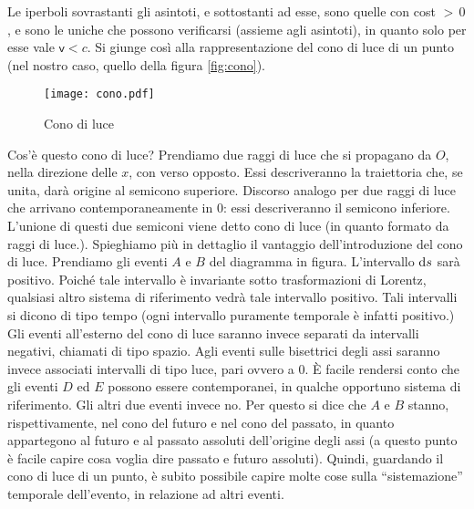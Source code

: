 Le iperboli sovrastanti gli asintoti, e sottostanti ad esse, sono
quelle con cost $>\,0$, e sono le uniche che possono verificarsi
(assieme agli asintoti), in quanto solo per esse vale
$\mathsf{v}<c$. Si giunge cos\`i alla rappresentazione del cono
di luce di un punto (nel nostro caso, quello della
figura \vref{fig:cono}).
\begin{figure}[tb]
  \begin{center}
     
       
    \texttt{[image: cono.pdf]}
    \caption{Cono di luce} \label{fig:cono}
  \end{center}
\end{figure}
Cos'\`e questo cono di luce? Prendiamo due raggi di luce che si
propagano da $O$, nella direzione delle $x$, con verso opposto.  Essi
descriveranno la traiettoria che, se unita, dar\`a origine al semicono
superiore. Discorso analogo per due raggi di luce che arrivano
contemporaneamente in $0$: essi descriveranno il semicono
inferiore. L'unione di questi due semiconi viene detto cono di luce
(in quanto formato da raggi di luce.). Spieghiamo pi\`u in dettaglio
il vantaggio dell'introduzione del cono di luce.  Prendiamo gli eventi
$A$ e $B$ del diagramma in figura.  L'intervallo $\mathrm{d} s$ sar\`a
positivo. Poich\'e tale intervallo \`e invariante sotto trasformazioni
di Lorentz, qualsiasi altro sistema di riferimento vedr\`a tale
 intervallo positivo. Tali intervalli si dicono di tipo tempo (ogni
intervallo puramente temporale \`e infatti positivo.) Gli eventi
all'esterno del cono di luce saranno invece separati da intervalli
negativi, chiamati di tipo spazio. Agli eventi sulle bisettrici degli
assi saranno invece associati intervalli di tipo luce, pari ovvero a
0. \`E facile rendersi conto che gli eventi $D$ ed $E$ possono essere
contemporanei, in qualche opportuno sistema di riferimento. Gli altri
due eventi invece no. Per questo si dice che $A$ e $B$ stanno,
rispettivamente, nel cono del futuro e nel cono del passato, in quanto
appartegono al futuro e al passato assoluti
dell'origine degli assi (a questo punto \`e
facile capire cosa voglia dire passato e futuro assoluti). Quindi,
guardando il cono di luce di un punto, \`e subito possibile capire
molte cose sulla ``sistemazione'' temporale dell'evento, in relazione
ad altri eventi.

